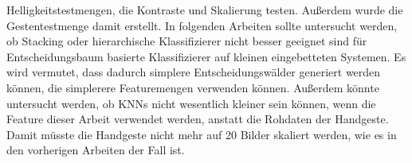 Helligkeitstestmengen, die Kontraste und Skalierung testen. Außerdem wurde die Gestentestmenge damit erstellt.
\newline
\newline
In folgenden Arbeiten sollte untersucht werden, ob Stacking oder hierarchische Klassifizierer nicht besser geeignet sind für Entscheidungsbaum basierte Klassifizierer auf kleinen eingebetteten Systemen.
Es wird vermutet, dass dadurch simplere Entscheidungswälder generiert werden können, die simplerere Featuremengen verwenden können.
\newline
\newline
Außerdem könnte untersucht werden, ob KNNs nicht wesentlich kleiner sein können, wenn die Feature dieser Arbeit verwendet werden, anstatt die Rohdaten der Handgeste. Damit müsste die Handgeste nicht mehr auf 20
Bilder skaliert werden, wie es in den vorherigen Arbeiten der Fall ist.